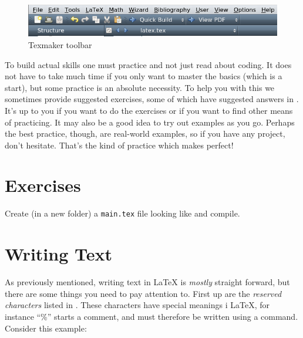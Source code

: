 \begin{figure}
	\centering
	\includegraphics[width=\textwidth]{graphics/texmaker.png}
	\caption{Texmaker toolbar}
	\label{fig:latex:texmaker}
\end{figure}

To build actual skills one must practice and not just read about coding. It does not have to take much time if you only want to master the basics (which is a start), but some practice is an absolute necessity. To help you with this we sometimes provide suggested exercises, some of which have suggested answers in . It's up to you if you want to do the exercises or if you want to find other means of practicing. It may also be a good idea to try out examples as you go. Perhaps the best practice, though, are real-world examples, so if you have any project, don't hesitate. That's the kind of practice which makes perfect!

\section{Exercises}
\begin{ExerciseList}
	\Exercise Create (in a new folder) a \verb|main.tex| file looking like  and compile.
\end{ExerciseList}

\section{Writing Text}\label{sec:latex:writing}
As previously mentioned, writing text in \LaTeX{} is \emph{mostly} straight forward, but there are some things you need to pay attention to. First up are the \emph{reserved characters} listed in . These characters have special meanings i \LaTeX{}, for instance ``\%'' starts a comment, and must therefore be written using a command. Consider this example:

